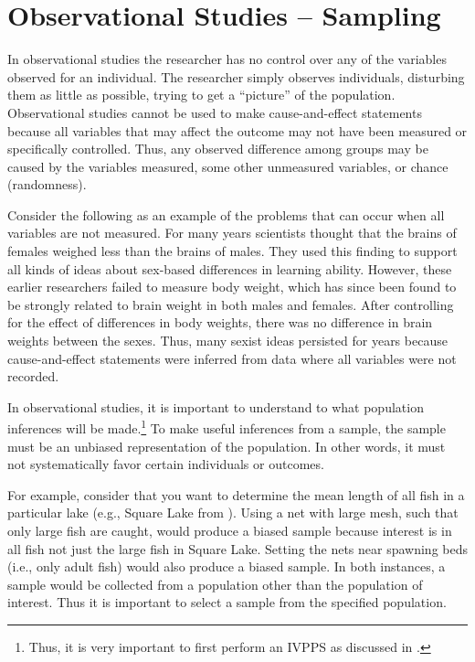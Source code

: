 \documentclass[10pt,openany]{book}\usepackage[]{graphicx}\usepackage[]{color}
\begin{document}
\vspace{-24pt}
\section{Observational Studies -- Sampling}
\vspace{-9pt}
In observational studies the researcher has no control over any of the variables observed for an individual.  The researcher simply observes individuals, disturbing them as little as possible, trying to get a ``picture'' of the population.  Observational studies cannot be used to make cause-and-effect statements because all variables that may affect the outcome may not have been measured or specifically controlled.  Thus, any observed difference among groups may be caused by the variables measured, some other unmeasured variables, or chance (randomness).

Consider the following as an example of the problems that can occur when all variables are not measured.  For many years scientists thought that the brains of females weighed less than the brains of males.  They used this finding to support all kinds of ideas about sex-based differences in learning ability.  However, these earlier researchers failed to measure body weight, which has since been found to be strongly related to brain weight in both males and females.  After controlling for the effect of differences in body weights, there was no difference in brain weights between the sexes.  Thus, many sexist ideas persisted for years because cause-and-effect statements were inferred from data where all variables were not recorded.


In observational studies, it is important to understand to what population inferences will be made.\footnote{Thus, it is very important to first perform an IVPPS as discussed in .}  To make useful inferences from a sample, the sample must be an unbiased representation of the population.  In other words, it must not systematically favor certain individuals or outcomes.

For example, consider that you want to determine the mean length of all fish in a particular lake (e.g., Square Lake from ).  Using a net with large mesh, such that only large fish are caught, would produce a biased sample because interest is in all fish not just the large fish in Square Lake.  Setting the nets near spawning beds (i.e., only adult fish) would also produce a biased sample.  In both instances, a sample would be collected from a population other than the population of interest.  Thus it is important to select a sample from the specified population.
\end{document}
